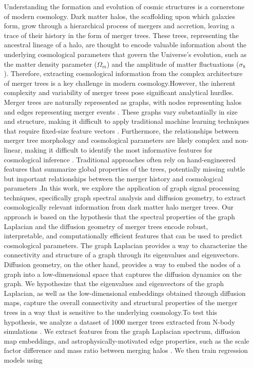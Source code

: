 \documentclass[twocolumn]{aastex631}
\begin{document}
Understanding the formation and evolution of cosmic structures is a cornerstone of modern cosmology. Dark matter halos, the scaffolding upon which galaxies form, grow through a hierarchical process of mergers and accretion, leaving a trace of their history in the form of merger trees. These trees, representing the ancestral lineage of a halo, are thought to encode valuable information about the underlying cosmological parameters that govern the Universe's evolution, such as the matter density parameter ($\Omega_m$) and the amplitude of matter fluctuations ($\sigma_8$). Therefore, extracting cosmological information from the complex architecture of merger trees is a key challenge in modern cosmology.However, the inherent complexity and variability of merger trees pose significant analytical hurdles. Merger trees are naturally represented as graphs, with nodes representing halos and edges representing merger events \citep{parkinson2007generatingdarkmatterhalo,robles2022deeplearningapproachhalo}. These graphs vary substantially in size and structure, making it difficult to apply traditional machine learning techniques that require fixed-size feature vectors \citep{robles2022deeplearningapproachhalo}. Furthermore, the relationships between merger tree morphology and cosmological parameters are likely complex and non-linear, making it difficult to identify the most informative features for cosmological inference \citep{geda2025constructingmergertreesdensity}. Traditional approaches often rely on hand-engineered features that summarize global properties of the trees, potentially missing subtle but important relationships between the merger history and cosmological parameters \citep{parkinson2007generatingdarkmatterhalo,jung2024mergertreebasedgalaxymatching}.In this work, we explore the application of graph signal processing techniques, specifically graph spectral analysis and diffusion geometry, to extract cosmologically relevant information from dark matter halo merger trees. Our approach is based on the hypothesis that the spectral properties of the graph Laplacian and the diffusion geometry of merger trees encode robust, interpretable, and computationally efficient features that can be used to predict cosmological parameters. The graph Laplacian provides a way to characterize the connectivity and structure of a graph through its eigenvalues and eigenvectors. Diffusion geometry, on the other hand, provides a way to embed the nodes of a graph into a low-dimensional space that captures the diffusion dynamics on the graph. We hypothesize that the eigenvalues and eigenvectors of the graph Laplacian, as well as the low-dimensional embeddings obtained through diffusion maps, capture the overall connectivity and structural properties of the merger trees in a way that is sensitive to the underlying cosmology.To test this hypothesis, we analyze a dataset of 1000 merger trees extracted from N-body simulations \citep{bose2022constructinghighfidelityhalomerger}. We extract features from the graph Laplacian spectrum, diffusion map embeddings, and astrophysically-motivated edge properties, such as the scale factor difference and mass ratio between merging halos \citep{bose2022constructinghighfidelityhalomerger,chandrogómez2025accuracydarkmatterhalo}. We then train regression models using 
\end{document}
